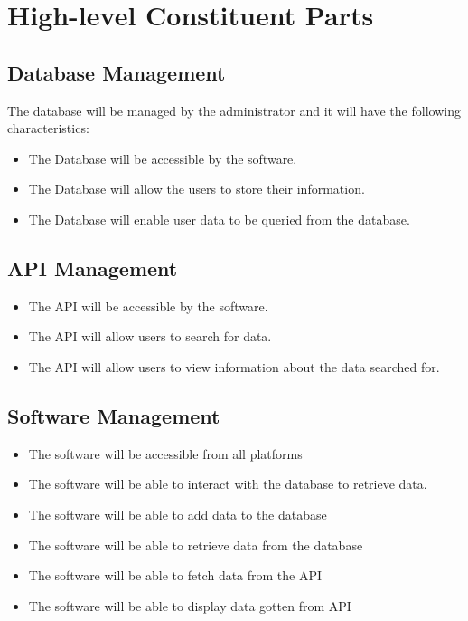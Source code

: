 \documentclass[twoside, a4paper, 12pt]{report}
\begin{document}
\section{High-level Constituent Parts}
\subsection{Database Management}
The database will be managed by the administrator and it will have the following characteristics:
\begin{itemize}
	\item The Database will be accessible by the software.
	\item The Database will allow the users to store their information.
	\item The Database will enable user data to be queried from the database.
\end{itemize}

\subsection{API Management}
\begin{itemize}
	\item The API will be accessible by the software.
	\item The API will allow users to search for data.
	\item The API will allow users to view information about the data searched for.
\end{itemize}

\subsection{Software Management}
\begin{itemize}
	\item The software will be accessible from all platforms
	\item The software will be able to interact with the database to retrieve data.
	\item The software will be able to add data to the database
	\item The software will be able to retrieve data from the database
	\item The software will be able to fetch data from the API
	\item The software will be able to display data gotten from API
\end{itemize}
\end{document}
